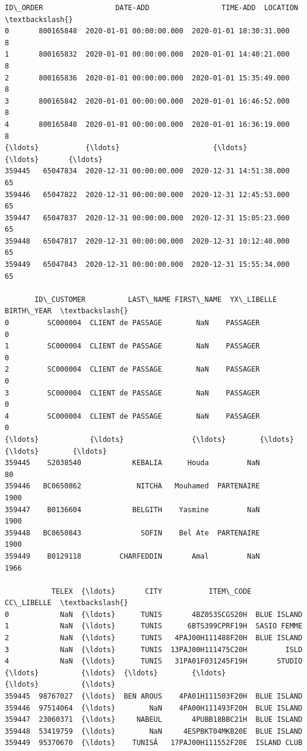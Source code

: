 \documentclass[11pt]{article}
\makeatletter
\newcommand{\boxspacing}{\kern\kvtcb@left@rule\kern\kvtcb@boxsep}
\newcommand{\prompt}[4]{
        \ttfamily\llap{{\color{#2}[#3]:\hspace{3pt}#4}}\vspace{-\baselineskip}
    }
\makeatother
\begin{document}
            \begin{tcolorbox}[breakable, size=fbox, boxrule=.5pt, pad at break*=1mm, opacityfill=0]
\prompt{Out}{outcolor}{2}{\boxspacing}
\begin{Verbatim}[commandchars=\\\{\}]
         ID\_ORDER                 DATE-ADD                 TIME-ADD  LOCATION  \textbackslash{}
0       800165848  2020-01-01 00:00:00.000  2020-01-01 18:30:31.000         8
1       800165832  2020-01-01 00:00:00.000  2020-01-01 14:40:21.000         8
2       800165836  2020-01-01 00:00:00.000  2020-01-01 15:35:49.000         8
3       800165842  2020-01-01 00:00:00.000  2020-01-01 16:46:52.000         8
4       800165840  2020-01-01 00:00:00.000  2020-01-01 16:36:19.000         8
{\ldots}           {\ldots}                      {\ldots}                      {\ldots}       {\ldots}
359445   65047834  2020-12-31 00:00:00.000  2020-12-31 14:51:38.000        65
359446   65047822  2020-12-31 00:00:00.000  2020-12-31 12:45:53.000        65
359447   65047837  2020-12-31 00:00:00.000  2020-12-31 15:05:23.000        65
359448   65047817  2020-12-31 00:00:00.000  2020-12-31 10:12:40.000        65
359449   65047843  2020-12-31 00:00:00.000  2020-12-31 15:55:34.000        65

       ID\_CUSTOMER          LAST\_NAME FIRST\_NAME  YX\_LIBELLE BIRTH\_YEAR  \textbackslash{}
0         SC000004  CLIENT de PASSAGE        NaN    PASSAGER          0
1         SC000004  CLIENT de PASSAGE        NaN    PASSAGER          0
2         SC000004  CLIENT de PASSAGE        NaN    PASSAGER          0
3         SC000004  CLIENT de PASSAGE        NaN    PASSAGER          0
4         SC000004  CLIENT de PASSAGE        NaN    PASSAGER          0
{\ldots}            {\ldots}                {\ldots}        {\ldots}         {\ldots}        {\ldots}
359445    S2038540            KEBALIA      Houda         NaN         80
359446   BC0650862             NITCHA   Mouhamed  PARTENAIRE       1900
359447    B0136604            BELGITH    Yasmine         NaN       1900
359448   BC0650843              SOFIN    Bel Ate  PARTENAIRE       1900
359449    B0129118         CHARFEDDIN       Amal         NaN       1966

           TELEX  {\ldots}       CITY           ITEM\_CODE   CC\_LIBELLE  \textbackslash{}
0            NaN  {\ldots}      TUNIS       4BZ053SCGS20H  BLUE ISLAND
1            NaN  {\ldots}      TUNIS      6BTS399CPRF19H  SASIO FEMME
2            NaN  {\ldots}      TUNIS   4PAJ00H111488F20H  BLUE ISLAND
3            NaN  {\ldots}      TUNIS  13PAJ00H111475C20H         ISLD
4            NaN  {\ldots}      TUNIS   31PA01F031245F19H       STUDIO
{\ldots}          {\ldots}  {\ldots}        {\ldots}                 {\ldots}          {\ldots}
359445  98767027  {\ldots}  BEN AROUS    4PA01H111503F20H  BLUE ISLAND
359446  97514064  {\ldots}        NaN    4PA00H111493F20H  BLUE ISLAND
359447  23060371  {\ldots}     NABEUL       4PUBB18BBC21H  BLUE ISLAND
359448  53419759  {\ldots}        NaN     4ESPBKT04MKB20E  BLUE ISLAND
359449  95370670  {\ldots}    TUNISÂ   17PAJ00H111552F20E  ISLAND CLUB


\end{Verbatim}
\end{tcolorbox}
\end{document}
